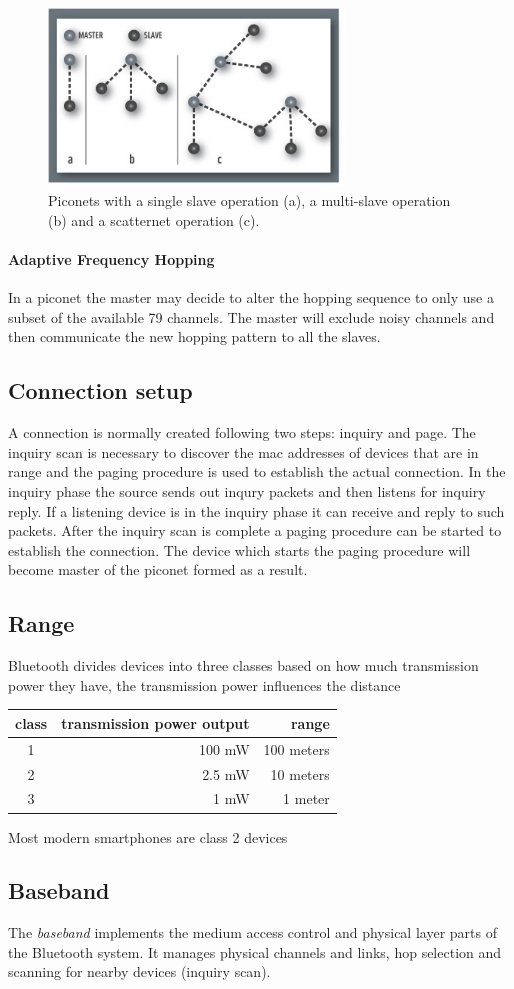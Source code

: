 \begin{figure}[h!]
  \centering
  \includegraphics[width=0.7\textwidth]{img/piconets.jpg} 
  \caption{Piconets with a single slave operation (a), a multi-slave operation (b) and a scatternet operation (c).}
\end{figure}

\paragraph{Adaptive Frequency Hopping}
In a piconet the master may decide to alter the hopping sequence to only use a subset of the available 79 channels. The master will exclude  noisy channels and then communicate the new hopping pattern to all the slaves.

\subsection{Connection setup}
A connection is normally created following two steps: inquiry and page.
The inquiry scan is necessary to discover the mac addresses of devices that are in range and the paging procedure is used to establish the actual connection.
In the inquiry phase the source sends out inqury packets and then listens for inquiry reply.
If a listening device is in the inquiry phase it can receive and reply to such packets.
After the inquiry scan is complete a paging procedure can be started to establish the connection.
The device which starts the paging procedure will become master of the piconet formed as a result.

\subsection{Range}
Bluetooth divides devices into three classes based on how much transmission power they have, the transmission power influences the distance 

\vspace{0.3cm}
\begin{tabular}{|c|r|r|}
 \hline
 class & transmission power output & range \\ \hline
 1 & 100 mW & 100 meters \\
 2 & 2.5 mW & 10 meters \\
 3 & 1 mW & 1 meter \\
 \hline
\end{tabular}
\vspace{0.3cm} 

\noindent
Most modern smartphones are class 2 devices

\subsection{Baseband}
The \emph{baseband} implements the medium access control and physical layer parts of the Bluetooth system.
It manages physical channels and links, hop selection and scanning for nearby devices (inquiry scan).

